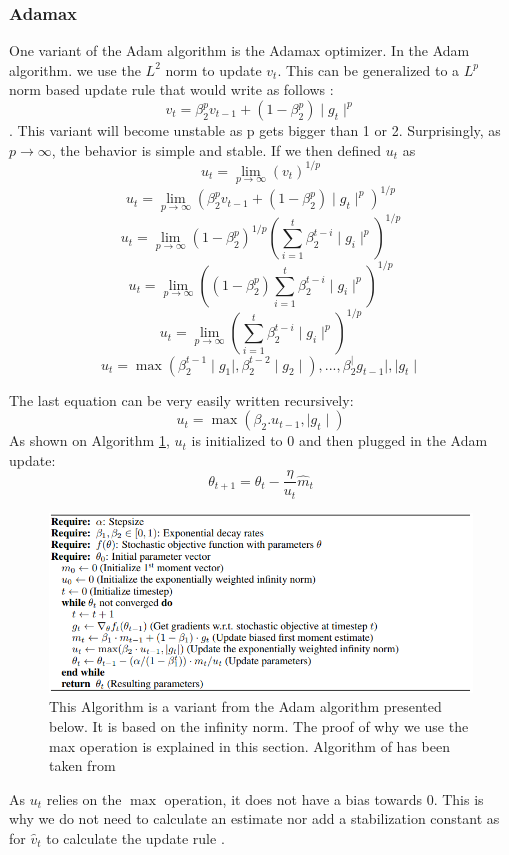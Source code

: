 \subsubsection{Adamax}
One variant of the Adam algorithm is the Adamax optimizer. In the Adam algorithm. we use the \(L^2\) norm to update \(v_t\). This can be generalized to a \(L^p\) norm based update rule that would write as follows : \[ v_t = \beta_2^p v_{t-1} + (1 - \beta_2^p) \mid g_t\mid^p \] . This variant will become unstable as p gets bigger than 1 or 2. Surprisingly, as \(p\to\infty\), the behavior is simple and stable. If we then defined \(u_t\) as \[u_t = \lim_{p\to\infty}(v_t)^{1/p}\]
\[u_t = \lim_{p\to\infty}(\beta_2^p v_{t-1} + (1 - \beta_2^p)\mid g_t\mid^p)^{1/p}\] 
\[u_t = \lim_{p\to\infty}(1 - \beta_2^p)^{1/p}(\sum_{i=1}^{t}\beta_2^{t-i} \mid g_i\mid ^p)^{1/p}\]
\[u_t = \lim_{p\to\infty}((1 - \beta_2^p) \sum_{i=1}^{t}\beta_2^{t-i} \mid g_i\mid ^p)^{1/p}\]
\[u_t = \lim_{p\to\infty}(\sum_{i=1}^{t}\beta_2^{t-i} \mid g_i\mid ^p)^{1/p}\]
\[u_t = \max (\beta_2^{t-1}  \mid g_1\mid, \beta_2^{t-2}  \mid g_2\mid ), ..., \beta_2^ \mid g_{t-1}\mid, \mid g_t\mid\]

The last equation can be very easily written recursively: 
\[ u_t = \max(\beta_2 . u_{t-1},  \mid g_t\mid)\]
As shown on Algorithm \ref{fig:adamax_algo}, \(u_t\) is initialized to 0 and then plugged in the Adam update: 
\[\theta_{t+1} = \theta_t - \frac{\eta}{u_t} \hat{m}_t\]

\begin{figure}[!htp]
    \centering
        \includegraphics[width=1\textwidth]{figures/02-adamax_algo}
        \caption[Adamax Algorithm]{ This Algorithm is a variant from the Adam algorithm presented below. It is based on the infinity norm. The proof of why we use the max operation is explained in this section. Algorithm of has been taken from \cite{adam}}\label{fig:adamax_algo}
\end{figure}

As \(u_t\) relies on the \(\max\) operation, it does not have a bias towards 0. This is why we do not need to calculate an estimate nor add a stabilization constant as for \(\hat{v}_t\) to calculate the update rule \cite{adam}.

